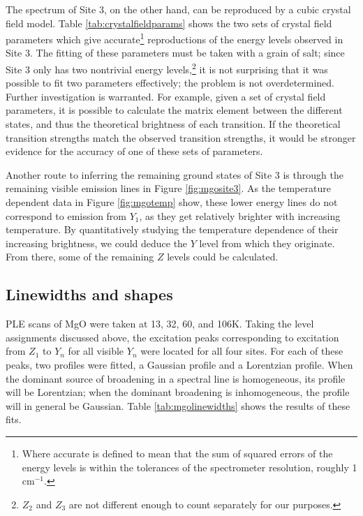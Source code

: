 \documentclass[12pt]{puthesis}
\newcommand{\wn}{cm$^{-1}$}
\begin{document}
The spectrum of Site 3, on the other hand, can be reproduced by a cubic crystal field model. Table \ref{tab:crystalfieldparams} shows the two sets of crystal field parameters which give accurate\footnote{Where accurate is defined to mean that the sum of squared errors of the energy levels is within the tolerances of the spectrometer resolution, roughly 1 \wn.} reproductions of the energy levels observed in Site 3. The fitting of these parameters must be taken with a grain of salt; since Site 3 only has two nontrivial energy levels,\footnote{$Z_{2}$ and $Z_{3}$ are not different enough to count separately for our purposes.} it is not surprising that it was possible to fit two parameters effectively; the problem is not overdetermined. Further investigation is warranted. For example, given a set of crystal field parameters, it is possible to calculate the matrix element between the different states, and thus the theoretical brightness of each transition. If the theoretical transition strengths match the observed transition strengths, it would be stronger evidence for the accuracy of one of these sets of parameters.

Another route to inferring the remaining ground states of Site 3 is through the remaining visible emission lines in Figure \ref{fig:mgosite3}. As the temperature dependent data in Figure \ref{fig:mgotemp} show, these lower energy lines do not correspond to emission from $Y_{1}$, as they get relatively brighter with increasing temperature. By quantitatively studying the temperature dependence of their increasing brightness, we could deduce the $Y$ level from which they originate. From there, some of the remaining $Z$ levels could be calculated.


\subsection{Linewidths and shapes}
\label{sec:linewidths-shapes}
PLE scans of MgO were taken at 13, 32, 60, and 106K. Taking the level assignments discussed above, the excitation peaks corresponding to excitation from $Z_{1}$ to $Y_{n}$ for all visible $Y_{n}$ were located for all four sites. For each of these peaks, two profiles were fitted, a Gaussian profile and a Lorentzian profile. When the dominant source of broadening in a spectral line is homogeneous, its profile will be Lorentzian; when the dominant broadening is inhomogeneous, the profile will in general be Gaussian. Table \ref{tab:mgolinewidths} shows the results of these fits.
\end{document}

